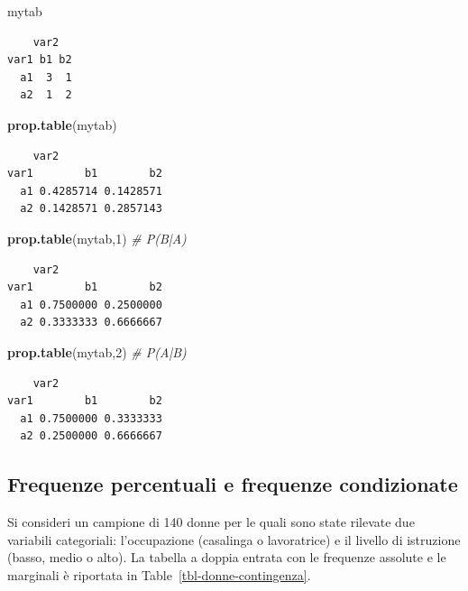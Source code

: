 \documentclass[
  a4paper,
  DIV=11,
  numbers=noendperiod]{scrreprt}
\newenvironment{Shaded}{\begin{snugshade}}{\end{snugshade}}
\newcommand{\CommentTok}[1]{\textcolor[rgb]{0.56,0.35,0.01}{\textit{#1}}}
\newcommand{\DecValTok}[1]{\textcolor[rgb]{0.00,0.00,0.81}{#1}}
\newcommand{\FunctionTok}[1]{\textcolor[rgb]{0.13,0.29,0.53}{\textbf{#1}}}
\newcommand{\NormalTok}[1]{#1}
\begin{document}
\begin{Shaded}
\begin{Highlighting}[]
\NormalTok{mytab}
\end{Highlighting}
\end{Shaded}

\begin{verbatim}
    var2
var1 b1 b2
  a1  3  1
  a2  1  2
\end{verbatim}

\begin{Shaded}
\begin{Highlighting}[]
\FunctionTok{prop.table}\NormalTok{(mytab)   }
\end{Highlighting}
\end{Shaded}

\begin{verbatim}
    var2
var1        b1        b2
  a1 0.4285714 0.1428571
  a2 0.1428571 0.2857143
\end{verbatim}

\begin{Shaded}
\begin{Highlighting}[]
\FunctionTok{prop.table}\NormalTok{(mytab,}\DecValTok{1}\NormalTok{)  }\CommentTok{\# P(B|A)}
\end{Highlighting}
\end{Shaded}

\begin{verbatim}
    var2
var1        b1        b2
  a1 0.7500000 0.2500000
  a2 0.3333333 0.6666667
\end{verbatim}

\begin{Shaded}
\begin{Highlighting}[]
\FunctionTok{prop.table}\NormalTok{(mytab,}\DecValTok{2}\NormalTok{)  }\CommentTok{\# P(A|B)}
\end{Highlighting}
\end{Shaded}

\begin{verbatim}
    var2
var1        b1        b2
  a1 0.7500000 0.3333333
  a2 0.2500000 0.6666667
\end{verbatim}

\subsection{Frequenze percentuali e frequenze
condizionate}\label{frequenze-percentuali-e-frequenze-condizionate}

Si consideri un campione di 140 donne per le quali sono state rilevate
due variabili categoriali: l'occupazione (casalinga o lavoratrice) e il
livello di istruzione (basso, medio o alto). La tabella a doppia entrata
con le frequenze assolute e le marginali è riportata in
Table~\ref{tbl-donne-contingenza}.
\end{document}
